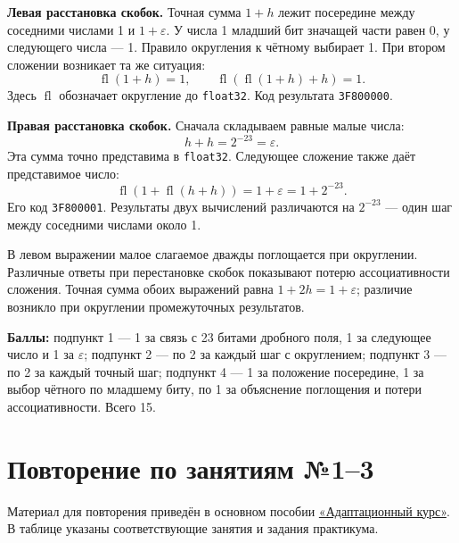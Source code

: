 \textbf{Левая расстановка скобок.} Точная сумма $1+h$ лежит посередине между соседними числами 1 и $1+\varepsilon$. У числа 1 младший бит значащей части равен 0, у следующего числа --- 1. Правило округления к чётному выбирает 1. При втором сложении возникает та же ситуация:
\[
\operatorname{fl}(1+h)=1,\qquad
\operatorname{fl}(\operatorname{fl}(1+h)+h)=1.
\]
Здесь $\operatorname{fl}$ обозначает округление до \texttt{float32}. Код результата \texttt{3F800000}.

\textbf{Правая расстановка скобок.} Сначала складываем равные малые числа:
\[
h+h=2^{-23}=\varepsilon.
\]
Эта сумма точно представима в \texttt{float32}. Следующее сложение также даёт представимое число:
\[
\operatorname{fl}(1+\operatorname{fl}(h+h))
=1+\varepsilon=1+2^{-23}.
\]
Его код \texttt{3F800001}. Результаты двух вычислений различаются на $2^{-23}$ --- один шаг между соседними числами около 1.

В левом выражении малое слагаемое дважды поглощается при округлении. Различные ответы при перестановке скобок показывают потерю ассоциативности сложения. Точная сумма обоих выражений равна $1+2h=1+\varepsilon$; различие возникло при округлении промежуточных результатов.

\textbf{Баллы:} подпункт 1 --- 1 за связь с 23 битами дробного поля, 1 за следующее число и 1 за $\varepsilon$; подпункт 2 --- по 2 за каждый шаг с округлением; подпункт 3 --- по 2 за каждый точный шаг; подпункт 4 --- 1 за положение посередине, 1 за выбор чётного по младшему биту, по 1 за объяснение поглощения и потери ассоциативности. Всего 15.

\section{Повторение по занятиям №1--3}\label{review:mock13}
Материал для повторения приведён в основном пособии \href{adaptation_course.pdf}{«Адаптационный курс»}. В таблице указаны соответствующие занятия и задания практикума.

